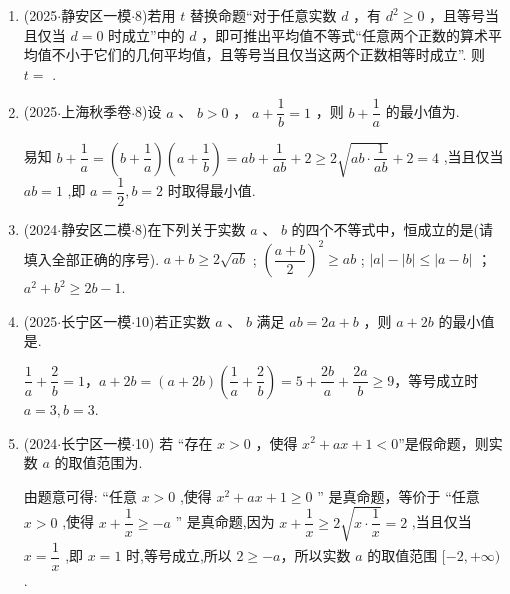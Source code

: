 \begin{enumerate}
    \item (2025$\cdot$静安区一模$\cdot$8)若用 $t$ 替换命题“对于任意实数 $d$ ，有 ${d}^{2} \geq  0$ ，且等号当且仅当 $d = 0$ 时成立”中的 $d$ ，即可推出平均值不等式“任意两个正数的算术平均值不小于它们的几何平均值，且等号当且仅当这两个正数相等时成立”. 则 $t =$ .

    \item (2025$\cdot$上海秋季卷$\cdot$8)设 $a$ 、 $b > 0$ ， $a + \dfrac{1}{b} = 1$ ，则 $b + \dfrac{1}{a}$ 的最小值为.
    \begin{jieda}
        易知 $b + \dfrac{1}{a} = \left( {b + \dfrac{1}{a}}\right) \left( {a + \dfrac{1}{b}}\right)  = {ab} + \dfrac{1}{ab} + 2 \geq  2\sqrt{{ab} \cdot  \dfrac{1}{ab}} + 2 = 4$ ,当且仅当 ${ab} = 1$ ,即 $a = \dfrac{1}{2},b = 2$ 时取得最小值.
    \end{jieda}

    \item (2024$\cdot$静安区二模$\cdot$8)在下列关于实数 $a$ 、 $b$ 的四个不等式中，恒成立的是(请填入全部正确的序号).
      $a + b \geq  2\sqrt{ab}$ ;    ${\left( \dfrac{a + b}{2}\right) }^{2} \geq  {ab}$ ;    $\left| a\right|  - \left| b\right|  \leq  \left| {a - b}\right|$ ；   ${a}^{2} + {b}^{2} \geq  {2b} - 1$.

    \item (2025$\cdot$长宁区一模$\cdot$10)若正实数 $a$ 、 $b$ 满足 ${ab} = {2a} + b$ ，则 $a + {2b}$ 的最小值是.
    \begin{jieda}
        $\dfrac{1}{a} + \dfrac{2}{b} = 1$，$a+2b = (a+2b)\left(\dfrac{1}{a} + \dfrac{2}{b}\right) = 5 + \dfrac{2b}{a} + \dfrac{2a}{b} \geq 9$，等号成立时 $a = 3,b = 3$.
    \end{jieda}

    \item (2024$\cdot$长宁区一模$\cdot$10) 若 “存在 $x > 0$ ，使得 ${x}^{2} + {ax} + 1 < 0$”是假命题，则实数 $a$ 的取值范围为.
    \begin{jieda}
        由题意可得: “任意 $x > 0$ ,使得 ${x}^{2} + {ax} + 1 \geq  0$ ” 是真命题，等价于 “任意 $x > 0$ ,使得 $x + \dfrac{1}{x} \geq   - a$ ” 是真命题,因为 $x + \dfrac{1}{x} \geq  2\sqrt{x \cdot  \dfrac{1}{x}} = 2$ ,当且仅当 $x = \dfrac{1}{x}$ ,即 $x = 1$ 时,等号成立,所以 $2 \geq   - a$，所以实数 $a$ 的取值范围 $\lbrack  - 2, +\infty )$.
    \end{jieda}


\end{enumerate}
